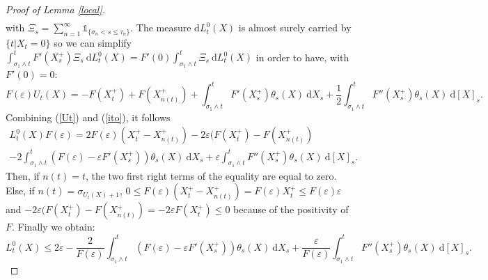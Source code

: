 \documentclass[11pt]{enstaPRE}
\newcommand{\di}{\mathrm{d}}
\begin{document}
\begin{proof}[Proof of Lemma \ref{local}]
\begin{multline*}
    \end{multline*}
    with $\Xi_s = \sum_{n=1}^\infty \mathds{1}_{\{\sigma_n<s\leq\tau_n\}}$.
    The measure $\di L^0_t(X)$ is almost surely carried by $\{t|X_t=0\}$ so we can simplify $\int_{\sigma_1\wedge t}^{t} F'\left(X_s^+\right)\Xi_s\ \di L^0_t(X) =F'(0)\int_{\sigma_1\wedge t}^{t} \Xi_s\ \di L^0_t(X)$ in order to have, with $F'(0)=0$:
    \begin{equation}\label{ito}
    F(\varepsilon)U_t(X) = - F\left(X^+_t\right) + F\left(X^+_{n(t)}\right) + \int_{\sigma_1\wedge t}^{ t} F'\left(X_s^+\right) \theta_s(X)\ \di X_s + \frac{1}{2}\int_{\sigma_1\wedge t}^{t} F''\left(X_s^+\right) \theta_s(X)\ \di [X]_s.
    \end{equation}
    Combining (\ref{Ut}) and (\ref{ito}), it follows
    \begin{multline*}
    L^0_t(X) F(\varepsilon) = 2 F(\varepsilon)(X^+_t-X^+_{n(t)})-2\varepsilon(F\left(X^+_t\right)-F\left(X^+_{n(t)}\right)\\-2\int_{\sigma_1\wedge t}^{ t} \left(F(\varepsilon) - \varepsilon F'\left(X_s^+\right)\right) \theta_s(X)\ \di X_s + \varepsilon\int_{\sigma_1\wedge t}^{t} F''\left(X_s^+\right)\theta_s(X)\ \di [X]_s.
    \end{multline*}
    Then, if $n(t) = t$, the two first right terms of the equality are equal to zero. Else, if $n(t) = \sigma_{U_t(X)+1}$, $0\leq F(\varepsilon)(X^+_t-X^+_{n(t)})=F(\varepsilon)X^+_t\leq F(\varepsilon)\varepsilon$ and $-2\varepsilon(F\left(X^+_t\right)-F\left(X^+_{n(t)}\right)=-2\varepsilon F\left(X^+_t\right)\leq0$ because of the positivity of $F$. Finally we obtain:
    \begin{equation*}
    L^0_t(X) \leq 2 \varepsilon-\frac{2}{F(\varepsilon)}\int_{\sigma_1\wedge t}^{ t} \left(F(\varepsilon) - \varepsilon F'\left(X_s^+\right)\right) \theta_s(X)\ \di X_s + \frac{\varepsilon}{F(\varepsilon)}\int_{\sigma_1\wedge t}^{t} F''\left(X_s^+\right)\theta_s(X)\ \di [X]_s.
    \end{equation*}
\end{proof}
\end{document}
